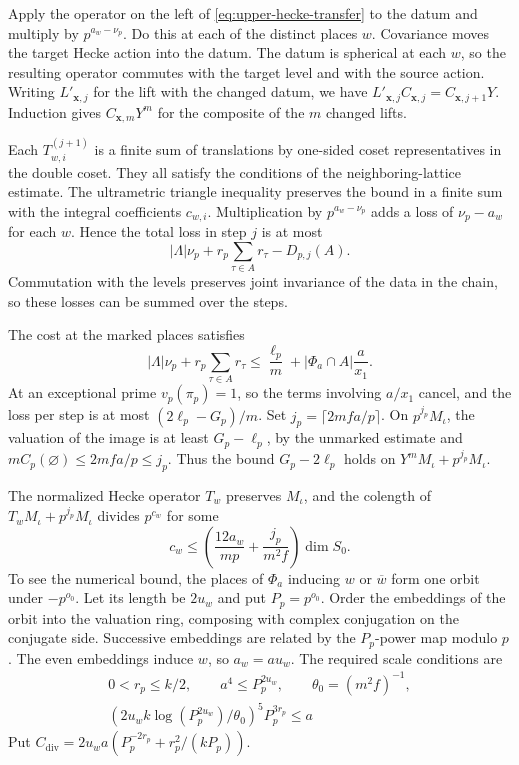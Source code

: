 Apply the operator on the left of \eqref{eq:upper-hecke-transfer}
to the datum and multiply by \(p^{a_w-\nu_p}\).
Do this at each of the distinct places \(w\).
Covariance moves the target Hecke action into the datum.
The datum is spherical at each \(w\), so the resulting operator
commutes with the target level and with the source action.
Writing \(L'_{\boldsymbol x,j}\) for the lift with the changed datum,
we have \(L'_{\boldsymbol x,j}C_{\boldsymbol x,j}
=C_{\boldsymbol x,j+1}Y\).
Induction gives \(C_{\boldsymbol x,m}Y^m\) for the composite of the
\(m\) changed lifts.

Each \(T_{w,i}^{(j+1)}\) is a finite sum of translations by one-sided
coset representatives in the double coset.
They all satisfy the conditions of the neighboring-lattice estimate.
The ultrametric triangle inequality preserves the bound in a
finite sum with the integral coefficients \(c_{w,i}\).
Multiplication by \(p^{a_w-\nu_p}\) adds a loss of \(\nu_p-a_w\)
for each \(w\). Hence the total loss in step \(j\) is at most
\[
  |\Lambda|\nu_p+r_p\sum_{\tau\in A}r_\tau-D_{p,j}(A).
\]
Commutation with the levels preserves joint invariance of the data
in the chain, so these losses can be summed over the steps.

The cost at the marked places satisfies
\[
 |\Lambda|\nu_p+r_p\sum_{\tau\in A}r_\tau
 \le \frac{\ell_p}{m}+|\Phi_a\cap A|\frac a{x_1}.
\]
At an exceptional prime \(v_p(\pi_p)=1\), so the terms involving
\(a/x_1\) cancel, and the loss per step is at most
\((2\ell_p-G_p)/m\).
Set \(j_p=\lceil 2mfa/p\rceil\).
On \(p^{j_p}M_\iota\), the valuation of the image is at least
\(G_p-\ell_p\), by the unmarked estimate and
\(mC_p(\varnothing)\le 2mfa/p\le j_p\).
Thus the bound \(G_p-2\ell_p\) holds on
\(Y^m M_\iota+p^{j_p}M_\iota\).

The normalized Hecke operator \(T_w\) preserves \(M_\iota\), and the
colength of \(T_wM_\iota+p^{j_p}M_\iota\) divides \(p^{c_w}\) for some
\[
  c_w\le\left(\frac{12a_w}{mp}+\frac{j_p}{m^2f}\right)\dim S_0 .
\]
To see the numerical bound, the places of \(\Phi_a\) inducing
\(w\) or \(\overline w\) form one orbit under \(-p^{o_0}\).
Let its length be \(2u_w\) and put \(P_p=p^{o_0}\).
Order the embeddings of the orbit into the valuation ring, composing with
complex conjugation on the conjugate side. Successive embeddings are
related by the \(P_p\)-power map modulo \(p\). The even embeddings induce
\(w\), so \(a_w=au_w\).
The required scale conditions are
\[
 \begin{gathered}
  0<r_p\le k/2,\qquad a^4\le P_p^{2u_w},\qquad \theta_0=(m^2f)^{-1},\\
  (2u_w k\log(P_p^{2u_w})/\theta_0)^5 P_p^{3r_p}\le a
 \end{gathered}
\]
Put \(C_{\mathrm{div}}=2u_wa(P_p^{-2r_p}+r_p^2/(kP_p))\).

